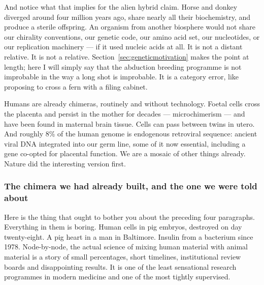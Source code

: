 And notice what that implies for the alien hybrid claim. Horse and donkey diverged around four
million years ago, share nearly all their biochemistry, and produce a sterile offspring.
An organism from another biosphere would not share our chirality conventions, our genetic code,
our amino acid set, our nucleotides, or our replication machinery --- if it used nucleic acids at
all. It is not a distant relative. It is not a relative. Section~\ref{sec:geneticmotivation} makes the point at length;
here I will simply say that the abduction breeding programme is not improbable in the way a long
shot is improbable. It is a category error, like proposing to cross a fern with a filing cabinet.

\begin{funfact}
Humans are already chimeras, routinely and without technology. Foetal cells cross the placenta and
persist in the mother for decades --- microchimerism --- and have been found in maternal brain
tissue. Cells can pass between twins in utero. And roughly 8\% of the human genome is
endogenous retroviral sequence: ancient viral DNA integrated into our germ line, some of it now
essential, including a gene co-opted for placental function. We are a mosaic of other things
already. Nature did the interesting version first.
\end{funfact}

\Needspace*{0.40\textheight}
\subsubsection*{The chimera we had already built, and the one we were told about}

Here is the thing that ought to bother you about the preceding four paragraphs. Everything in them
is boring. Human cells in pig embryos, destroyed on day twenty-eight. A pig heart in a man in
Baltimore. Insulin from a bacterium since 1978. Node-by-node, the actual science of mixing human
material with animal material is a story of small percentages, short timelines, institutional
review boards and disappointing results. It is one of the least sensational research programmes in
modern medicine and one of the most tightly supervised.

